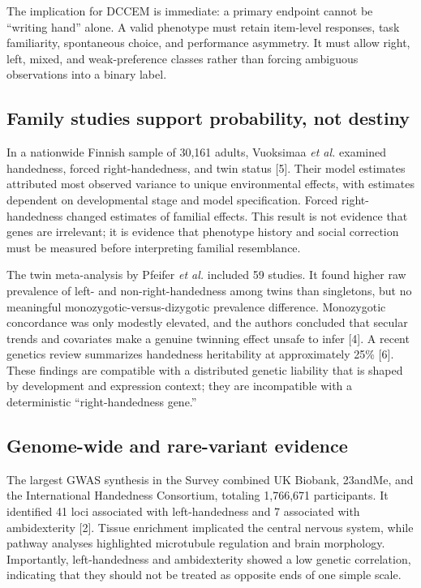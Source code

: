 \documentclass[10pt,conference]{IEEEtran}
\begin{document}
The implication for DCCEM is immediate: a primary endpoint cannot be ``writing hand'' alone. A valid phenotype must retain item-level responses, task familiarity, spontaneous choice, and performance asymmetry. It must allow right, left, mixed, and weak-preference classes rather than forcing ambiguous observations into a binary label.

\subsection{Family studies support probability, not destiny}
In a nationwide Finnish sample of 30,161 adults, Vuoksimaa \textit{et al.} examined handedness, forced right-handedness, and twin status [5]. Their model estimates attributed most observed variance to unique environmental effects, with estimates dependent on developmental stage and model specification. Forced right-handedness changed estimates of familial effects. This result is not evidence that genes are irrelevant; it is evidence that phenotype history and social correction must be measured before interpreting familial resemblance.

The twin meta-analysis by Pfeifer \textit{et al.} included 59 studies. It found higher raw prevalence of left- and non-right-handedness among twins than singletons, but no meaningful monozygotic-versus-dizygotic prevalence difference. Monozygotic concordance was only modestly elevated, and the authors concluded that secular trends and covariates make a genuine twinning effect unsafe to infer [4]. A recent genetics review summarizes handedness heritability at approximately 25\% [6]. These findings are compatible with a distributed genetic liability that is shaped by development and expression context; they are incompatible with a deterministic ``right-handedness gene.''

\subsection{Genome-wide and rare-variant evidence}
The largest GWAS synthesis in the Survey combined UK Biobank, 23andMe, and the International Handedness Consortium, totaling 1,766,671 participants. It identified 41 loci associated with left-handedness and 7 associated with ambidexterity [2]. Tissue enrichment implicated the central nervous system, while pathway analyses highlighted microtubule regulation and brain morphology. Importantly, left-handedness and ambidexterity showed a low genetic correlation, indicating that they should not be treated as opposite ends of one simple scale.
\end{document}
